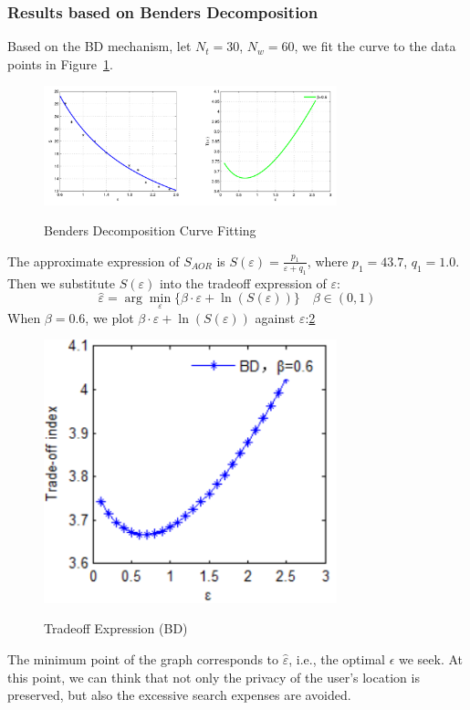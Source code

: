 \subsubsection{Results based on Benders Decomposition}
Based on the BD mechanism, let $N_t=30$, $N_w=60$, we fit the curve to the data points in Figure~\ref{img:CurveBD}.

\begin{figure}
\includegraphics[width=8.5cm]{CurveBD}
\label{img:CurveBD}
\caption{Benders Decomposition Curve Fitting}
\end{figure}

The approximate expression of $S_{AOR}$ is $S(\varepsilon)=\frac{p_1}{\varepsilon + q_1}$, where $p_1=43.7$, $q_1=1.0$. Then we substitute $S(\varepsilon)$ into the tradeoff expression of $\varepsilon$:
$$
	\hat{\varepsilon}=\arg \min_\varepsilon \{ \beta \cdot \varepsilon + \ln (S(\varepsilon)) \} \quad \beta \in (0,1)
$$
When $\beta=0.6$, we plot $\beta \cdot \varepsilon + \ln (S(\varepsilon))$ against $\varepsilon$:\ref{img:TradeoffBD}

\begin{figure}
\includegraphics[width=8.5cm]{TradeoffBD}
\label{img:TradeoffBD}
\caption{Tradeoff Expression (BD)}
\end{figure}

The minimum point of the graph corresponds to $\hat{\varepsilon}$, i.e., the optimal $\epsilon$ we seek. At this point, we can think that not only the privacy of the user's location is preserved, but also the excessive search expenses are avoided. 

